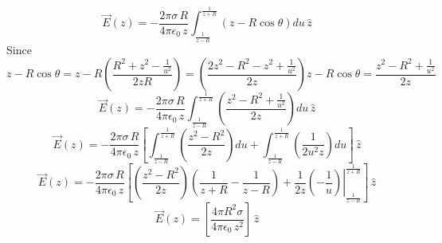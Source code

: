 $$\vec{E}(z)=-\frac{2\pi\sigma\,R}{4\pi\epsilon_0\,z}\int_{\frac{1}{z-R}}^{\frac{1}{z+R}}(z-R\cos{\theta})du\,\hat{z}$$
Since $$z-R\cos{\theta}=z-R\left(\frac{R^2+z^2-\frac{1}{u^2}}{2zR} \right )=\left(\frac{2z^2-R^2-z^2+\frac{1}{u^2}}{2z} \right )z-R\cos{\theta}=\frac{z^2-R^2+\frac{1}{u^2}}{2z}$$
$$\vec{E}(z)=-\frac{2\pi\sigma\,R}{4\pi\epsilon_0\,z}\int_{\frac{1}{z-R}}^{\frac{1}{z+R}}\left(\frac{z^2-R^2+\frac{1}{u^2}}{2z} \right )du\,\hat{z}$$
$$\vec{E}(z)=-\frac{2\pi\sigma\,R}{4\pi\epsilon_0\,z}\left[\int_{\frac{1}{z-R}}^{\frac{1}{z+R}}\left(\frac{z^2-R^2}{2z} \right )du+\int_{\frac{1}{z-R}}^{\frac{1}{z+R}}\left(\frac{1}{2u^2z} \right )du\right ]\,\hat{z}
$$
$$\vec{E}(z)=-\frac{2\pi\sigma\,R}{4\pi\epsilon_0\,z}\left[\left(\frac{z^2-R^2}{2z} \right )\left(\frac{1}{z+R}-\frac{1}{z-R} \right )+\frac{1}{2z}\left.\left(-\frac{1}{u} \right )\right|_{\frac{1}{z-R}}^{\frac{1}{z+R}}\right ]\,\hat{z}$$
$$\vec{E}(z)=\left[\frac{4\pi{R^2}\sigma}{4\pi\epsilon_0\,z^2} \right ]\,\hat{z}$$
